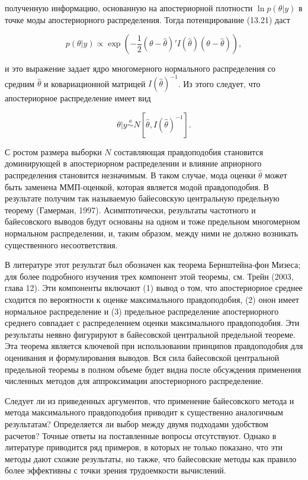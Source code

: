полученную информацию, основанную на апостериорной плотности $\ln {p(\theta|y)}$ в точке моды апостериорного распределения. Тогда потенцирование (13.21) даст

\[
p(\theta|y){\propto}\exp\left(-\dfrac{1}{2}(\theta-\hat{\theta})'I(\hat{\theta})(\theta-\hat{\theta})\right), 
\]

и это выражение задает ядро многомерного нормального распределения со средним $\hat{\theta}$ и ковариационной матрицей $I(\hat{\theta})^{-1}$. Из  этого следует, что апостериорное распределение имеет вид

\[
\theta|y \overset{a}{\sim} N[\hat{\theta},I(\hat{\theta})^{-1}].
\]

С ростом размера выборки $N$ составляющая правдоподобия становится доминирующей в апостериорном распределении и влияние априорного распределения становится незначимым. В таком случае, мода оценки $\hat{\theta}$ может быть заменена ММП-оценкой, которая является модой правдоподобия. В результате получим так называемую байесовскую центральную предельную теорему (Гамерман, 1997). Асимптотически, результаты частотного и байесовского выводов будут основаны на одном и тоже предельном многомерном нормальном распределении, и, таким образом, между ними не должно возникать существенного несоответствия. 

В литературе этот результат был обозначен как теорема Бернштейна-фон Мизеса; для более подробного изучения трех компонент этой теоремы, см. Трейн (2003, глава 12). Эти компоненты включают (1) вывод о том, что апостериорное среднее сходится по вероятности к  оценке максимального правдоподобия, (2) онон имеет нормальное распределение и (3) предельное распределение апостериорного среднего совпадает с распределением  оценки максимального правдоподобия. Эти результаты неявно фигурируют в байесовской центральной предельной теореме. Эта теорема является ключевой при использовании принципов правдоподобия для оценивания и формулирования выводов. Вся сила байесовской центральной предельной теоремы в полном объеме будет видна после обсуждения применения численных методов для аппроксимации апостериорного распределение. 

Следует ли из приведенных аргументов, что применение байесовского метода и метода максимального  правдоподобия приводит к существенно аналогичным результатам? Определяется ли выбор между двумя подходами удобством расчетов? Точные ответы на поставленные вопросы отсутствуют. Однако в литературе приводится ряд примеров, в которых не только показано, что эти методы дают схожие результаты, но также, что байесовские методы как правило более эффективны с точки зрения трудоемкости вычислений.

